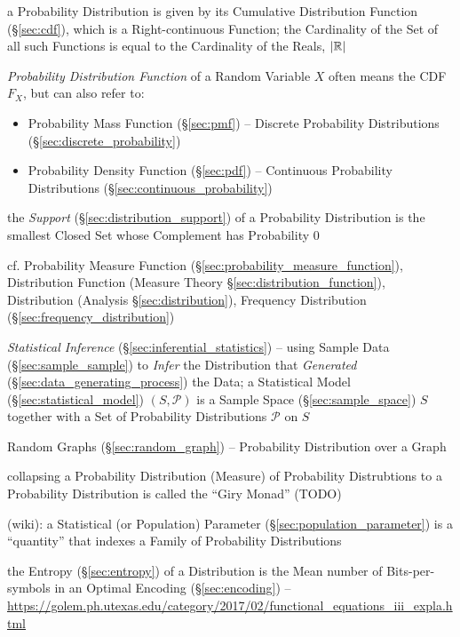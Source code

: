 a Probability Distribution is given by its Cumulative Distribution Function
(\S\ref{sec:cdf}), which is a Right-continuous Function; the Cardinality of the
Set of all such Functions is equal to the Cardinality of the Reals, $|\mathbb{R}|$

\emph{Probability Distribution Function} of a Random Variable $X$ often means
the CDF $F_X$, but can also refer
to:
\begin{itemize}
  \item Probability Mass Function (\S\ref{sec:pmf}) -- Discrete Probability
    Distributions (\S\ref{sec:discrete_probability})
  \item Probability Density Function (\S\ref{sec:pdf}) -- Continuous Probability
    Distributions (\S\ref{sec:continuous_probability})
\end{itemize}

the \emph{Support} (\S\ref{sec:distribution_support}) of a Probability
Distribution is the smallest Closed Set whose Complement has Probability $0$

\fist cf. Probability Measure Function
(\S\ref{sec:probability_measure_function}), Distribution Function (Measure
Theory \S\ref{sec:distribution_function}), Distribution (Analysis
\S\ref{sec:distribution}), Frequency Distribution
(\S\ref{sec:frequency_distribution})

\fist \emph{Statistical Inference} (\S\ref{sec:inferential_statistics}) -- using
Sample Data (\S\ref{sec:sample_sample}) to \emph{Infer} the Distribution
that \emph{Generated} (\S\ref{sec:data_generating_process}) the Data; a
Statistical Model (\S\ref{sec:statistical_model}) $(S,\mathcal{P})$ is a Sample
Space (\S\ref{sec:sample_space}) $S$ together with a Set of Probability
Distributions $\mathcal{P}$ on $S$

\fist Random Graphs (\S\ref{sec:random_graph}) -- Probability Distribution over
a Graph

collapsing a Probability Distribution (Measure) of Probability Distrubtions to a
Probability Distribution is called the ``Giry Monad'' (TODO)

(wiki): a Statistical (or Population) Parameter
(\S\ref{sec:population_parameter}) is a ``quantity'' that indexes a Family of
Probability Distributions

the Entropy (\S\ref{sec:entropy}) of a Distribution is the Mean number
of Bits-per-symbols in an Optimal Encoding (\S\ref{sec:encoding}) --
\url{https://golem.ph.utexas.edu/category/2017/02/functional_equations_iii_expla.html}

